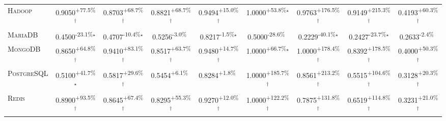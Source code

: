 \begin{table}[htbp]
\begin{tabular}{l|cccc|cccc}
\textsc{Hadoop} & \cellcolor{green!30}0.9050\textsuperscript{+77.5\%}$^\dagger$ & \cellcolor{green!30}0.8703\textsuperscript{+68.7\%}$^\dagger$ & \cellcolor{green!30}0.8821\textsuperscript{+68.7\%}$^\dagger$ & \cellcolor{green!30}0.9494\textsuperscript{+15.0\%}$^\dagger$ & \cellcolor{green!30}1.0000\textsuperscript{+53.8\%}$^\star$ & \cellcolor{green!30}0.9763\textsuperscript{+176.5\%}$^\dagger$ & \cellcolor{green!30}0.9149\textsuperscript{+215.3\%}$^\dagger$ & \cellcolor{green!30}0.4193\textsuperscript{+60.3\%}$^\dagger$ \\
\textsc{MariaDB} & \cellcolor{red!30}0.4500\textsuperscript{-23.1\%}$^\star$ & \cellcolor{red!30}0.4707\textsuperscript{-10.4\%}$^\star$ & \cellcolor{red!30}0.5256\textsuperscript{-3.0\%}$^{\,\,\,}$ & \cellcolor{red!30}0.8217\textsuperscript{-1.5\%}$^\star$ & \cellcolor{red!30}0.5000\textsuperscript{-28.6\%}$^{\,\,\,}$ & \cellcolor{red!30}0.2229\textsuperscript{-40.1\%}$^\star$ & \cellcolor{red!30}0.2427\textsuperscript{-23.7\%}$^\star$ & \cellcolor{red!30}0.2633\textsuperscript{-2.4\%}$^{\,\,\,}$ \\
\textsc{MongoDB} & \cellcolor{green!30}0.8650\textsuperscript{+64.8\%}$^\dagger$ & \cellcolor{green!30}0.9410\textsuperscript{+83.1\%}$^\dagger$ & \cellcolor{green!30}0.8517\textsuperscript{+63.7\%}$^\dagger$ & \cellcolor{green!30}0.9480\textsuperscript{+14.7\%}$^\dagger$ & \cellcolor{green!30}1.0000\textsuperscript{+66.7\%}$^\star$ & \cellcolor{green!30}1.0000\textsuperscript{+178.4\%}$^\dagger$ & \cellcolor{green!30}0.8392\textsuperscript{+178.5\%}$^\dagger$ & \cellcolor{green!30}0.4000\textsuperscript{+50.3\%}$^\dagger$ \\
\textsc{PostgreSQL} & \cellcolor{green!30}0.5100\textsuperscript{+41.7\%}$^\star$ & \cellcolor{green!30}0.5817\textsuperscript{+29.6\%}$^\dagger$ & \cellcolor{green!30}0.5454\textsuperscript{+6.1\%}$^{\,\,\,}$ & \cellcolor{green!30}0.8284\textsuperscript{+1.8\%}$^{\,\,\,}$ & \cellcolor{green!30}1.0000\textsuperscript{+185.7\%}$^\dagger$ & \cellcolor{green!30}0.8561\textsuperscript{+213.2\%}$^\dagger$ & \cellcolor{green!30}0.5515\textsuperscript{+104.6\%}$^\dagger$ & \cellcolor{green!30}0.3128\textsuperscript{+20.3\%}$^\dagger$ \\
\textsc{Redis} & \cellcolor{green!30}0.8900\textsuperscript{+93.5\%}$^\dagger$ & \cellcolor{green!30}0.8645\textsuperscript{+67.4\%}$^\dagger$ & \cellcolor{green!30}0.8295\textsuperscript{+55.3\%}$^\dagger$ & \cellcolor{green!30}0.9270\textsuperscript{+12.0\%}$^\dagger$ & \cellcolor{green!30}1.0000\textsuperscript{+122.2\%}$^\dagger$ & \cellcolor{green!30}0.7875\textsuperscript{+131.8\%}$^\dagger$ & \cellcolor{green!30}0.6519\textsuperscript{+114.8\%}$^\dagger$ & \cellcolor{green!30}0.3231\textsuperscript{+21.0\%}$^\dagger$ \\

\end{tabular}
\end{table}
